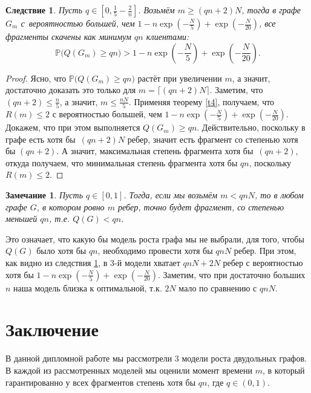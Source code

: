 \documentclass{matmex-diploma-custom}
\newcommand{\PRob}{\mathbb P}
\newcommand{\leqs}{\leqslant}
\newcommand{\geqs}{\geqslant}
\newtheorem{note}{Замечание}
\newtheorem{cons}{Следствие}
\theoremstyle{named}
\begin{document}
\begin{cons} \label{c2}
Пусть $q \in [0, \frac{1}{5} - \frac{2}{n}]$. 
Возьмём $m \geqs (qn + 2) N$, тогда в графе $G_m$ с~вероятностью большей, чем 
$1 - n\exp\left(-\frac{N}{5}\right) +  \exp\left(- \frac{N}{20}\right)$, все фрагменты скачены как минимум $qn$ клиентами:
\begin{equation}
\PRob\Big( Q(G_m) \geqs qn \Big) > 1 - n\exp\left(-\frac{N}{5}\right) +  \exp\left(- \frac{N}{20}\right).
\end{equation}
\end{cons}
\begin{proof}
Ясно, что $\PRob\Big( Q(G_m) \geqs qn \Big)$ растёт при увеличении $m$, а значит, 
достаточно доказать это только для $m = \lceil(qn + 2) N\rceil$. 
Заметим, что $(qn + 2) \leqs \frac{n}{5}$, а значит, $m \leqs \frac{nN}{5}$.
Применяя теорему \ref{t4}, получаем, что $R(m) \leqs 2$ с вероятностью большей, 
чем $1 - n\exp\left(-\frac{N}{5}\right) +  \exp\left(- \frac{N}{20}\right)$.
Докажем, что при этом выполняется $ Q(G_m) \geqs qn$.
Действительно, поскольку в графе есть хотя бы~$(qn + 2) N$ ребер, значит есть фрагмент со степенью хотя бы $(qn + 2)$.
А значит, максимальная степень фрагмента хотя бы~$(qn+2)$, откуда получаем, что минимальная степень фрагмента хотя бы $qn$, 
поскольку $R(m) \leqs 2$.
\end{proof}

\begin{note}
Пусть $q \in [0,1]$. Тогда, если мы возьмём $m < qnN$, то в любом графе $G$, в котором ровно $m$ ребер, точно будет фрагмент, 
со степенью меньшей $qn$, т.е. $Q(G) < qn$.
\end{note}

Это означает, что какую бы модель роста графа мы не выбрали, для того, чтобы~$Q(G)$ было хотя бы $qn$, необходимо
провести хотя бы $qnN$ ребер. 
При этом, как видно из следствия \ref{c2}, в 3-й модели хватает $qnN + 2N$ ребер
 с вероятностью хотя бы $1 - n\exp\left(-\frac{N}{5}\right) +  \exp\left(- \frac{N}{20}\right)$.
Заметим, что при достаточно больших $n$ наша модель близка к оптимальной, т.к. $2N$ мало по сравнению с $qnN$.
\newpage

\section*{Заключение}
В данной дипломной работе мы рассмотрели $3$ модели роста двудольных графов.
В каждой из рассмотренных моделей мы оценили момент времени $m$, 
в который гарантированно у всех фрагментов степень хотя бы $qn$, где $q \in (0,1)$.
\end{document}

